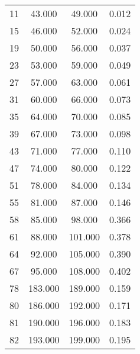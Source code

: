 % 
\begin{tabular}{cccc}
  \hline
  \hline
11 & 43.000 & 49.000 & 0.012 \\ 
  15 & 46.000 & 52.000 & 0.024 \\ 
  19 & 50.000 & 56.000 & 0.037 \\ 
  23 & 53.000 & 59.000 & 0.049 \\ 
  27 & 57.000 & 63.000 & 0.061 \\ 
  31 & 60.000 & 66.000 & 0.073 \\ 
  35 & 64.000 & 70.000 & 0.085 \\ 
  39 & 67.000 & 73.000 & 0.098 \\ 
  43 & 71.000 & 77.000 & 0.110 \\ 
  47 & 74.000 & 80.000 & 0.122 \\ 
  51 & 78.000 & 84.000 & 0.134 \\ 
  55 & 81.000 & 87.000 & 0.146 \\ 
  58 & 85.000 & 98.000 & 0.366 \\ 
  61 & 88.000 & 101.000 & 0.378 \\ 
  64 & 92.000 & 105.000 & 0.390 \\ 
  67 & 95.000 & 108.000 & 0.402 \\ 
  78 & 183.000 & 189.000 & 0.159 \\ 
  80 & 186.000 & 192.000 & 0.171 \\ 
  81 & 190.000 & 196.000 & 0.183 \\ 
  82 & 193.000 & 199.000 & 0.195 \\ 
   \hline
\end{tabular}
